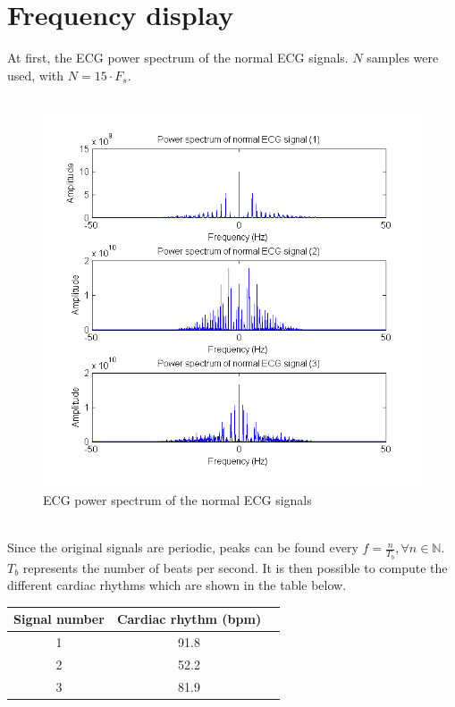 \documentclass[11pt]{report}
\begin{document}
	\section{Frequency display}
		At first, the ECG power spectrum of the normal ECG signals. $N$ samples were used, with $N = 15 \cdot F_s$.\\
		\\
		\begin{figure}[ht]
			\centering
			\includegraphics[scale=0.65]{images/Q321.png}
			\caption{ECG power spectrum of the normal ECG signals}
			\label{Q321}
		\end{figure}
		\\
		Since the original signals are periodic, peaks can be found every $f = \frac{n}{T_b}, \forall n \in \mathbb{N}$.\\
		$T_b$ represents the number of beats per second. It is then possible to compute the different cardiac rhythms which are shown in the table below.\\
		\begin{center}
			\begin{tabular}{|c|c|c|}
				\hline
				\textbf{Signal number} & \textbf{Cardiac rhythm (bpm)} \\
				\hline
				1 & 91.8 \\ 
				\hline
				2 & 52.2 \\
				\hline
				3 & 81.9 \\
				\hline
			\end{tabular}
		\end{center}
\end{document}
